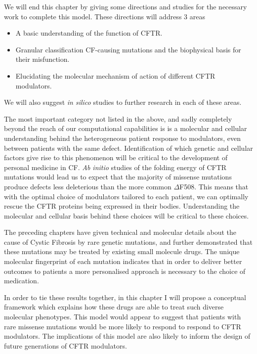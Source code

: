 We will end this chapter by giving some directions and studies for the necessary work to complete this model. These directions will address 3 areas 

\begin{itemize}
	\item A basic understanding of the function of CFTR.
	\item Granular classification CF-causing mutations and the biophysical basis for their misfunction.
	\item Elucidating the molecular mechanism of action of different CFTR modulators. 
\end{itemize}

We will also suggest \textit{in silico} studies to further research in each of these areas.

The most important category not listed in the above, and sadly completely beyond the reach of our computational capabilities is is a molecular and cellular understanding behind the heterogeneous patient response to modulators, even between patients with the same defect. Identification of which genetic and cellular factors give rise to this phenomenon will be critical to the development of personal medicine in CF. \textit{Ab initio} studies of the folding energy of CFTR mutations would lead us to expect that the majority of missense mutations produce defects less deleterious than the more common $\Delta$F508. This means that with the optimal choice of modulators tailored to each patient, we can optimally rescue the CFTR proteins being expressed in their bodies. Understanding the molecular and cellular basis behind these choices will be critical to these choices.

The preceding chapters have given technical and molecular details about the cause of Cystic Fibrosis by rare genetic mutations, and further demonstrated that these mutations may be treated by existing small molecule drugs. The unique molecular fingerprint of each mutation indicates that in order to deliver better outcomes to patients a more personalised approach is necessary to the choice of medication. 

In order to tie these results together, in this chapter I will propose a conceptual framework which explains how these drugs are able to treat such diverse molecular phenotypes. This model would appear to suggest that patients with rare missense mutations would be more likely to respond to respond to CFTR modulators. The implications of this model are also likely to inform the design of future generations of CFTR modulators. 

